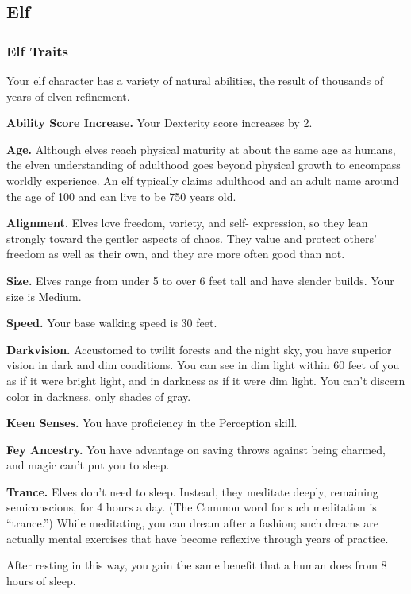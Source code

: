 \documentclass[
]{article}
\begin{document}
\hypertarget{elf}{%
\subsection{Elf}\label{elf}}

\hypertarget{elf-traits}{%
\subsubsection{Elf Traits}\label{elf-traits}}

Your elf character has a variety of natural abilities, the result of
thousands of years of elven refinement.

\textbf{Ability Score Increase.} Your Dexterity score increases by 2.

\textbf{Age.} Although elves reach physical maturity at about the same
age as humans, the elven understanding of adulthood goes beyond physical
growth to encompass worldly experience. An elf typically claims
adulthood and an adult name around the age of 100 and can live to be 750
years old.

\textbf{Alignment.} Elves love freedom, variety, and self- expression,
so they lean strongly toward the gentler aspects of chaos. They value
and protect others' freedom as well as their own, and they are more
often good than not.

\textbf{Size.} Elves range from under 5 to over 6 feet tall and have
slender builds. Your size is Medium.

\textbf{Speed.} Your base walking speed is 30 feet.

\textbf{Darkvision.} Accustomed to twilit forests and the night sky, you
have superior vision in dark and dim conditions. You can see in dim
light within 60 feet of you as if it were bright light, and in darkness
as if it were dim light. You can't discern color in darkness, only
shades of gray.

\textbf{Keen Senses.} You have proficiency in the Perception skill.

\textbf{Fey Ancestry.} You have advantage on saving throws against being
charmed, and magic can't put you to sleep.

\textbf{Trance.} Elves don't need to sleep. Instead, they meditate
deeply, remaining semiconscious, for 4 hours a day. (The Common word for
such meditation is ``trance.'') While meditating, you can dream after a
fashion; such dreams are actually mental exercises that have become
reflexive through years of practice.

After resting in this way, you gain the same benefit that a human does
from 8 hours of sleep.
\end{document}
